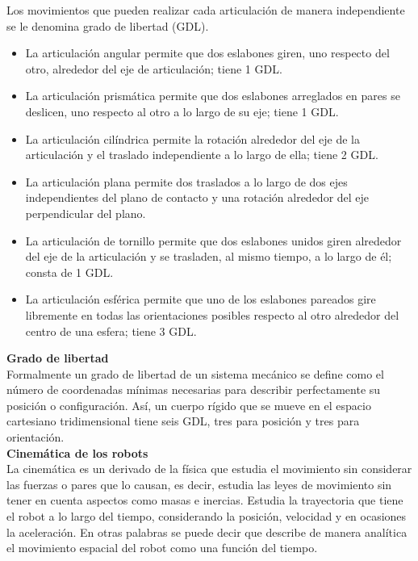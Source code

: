 Los movimientos que pueden realizar cada articulación de manera independiente se le denomina grado de libertad (GDL).
\begin{itemize}
\item La articulación angular permite que dos eslabones giren, uno respecto del otro, alrededor del eje de articulación; tiene 1 GDL.
\item La articulación prismática permite que dos eslabones arreglados en pares se deslicen, uno respecto al otro a lo largo de su eje; tiene 1 GDL.
\item La articulación cilíndrica permite la rotación alrededor del eje de la articulación y el traslado independiente a lo largo de ella; tiene 2 GDL.
\item La articulación plana permite dos traslados a lo largo de dos ejes independientes del plano de contacto y una rotación alrededor del eje perpendicular del plano.
\item La articulación de tornillo permite que dos eslabones unidos giren alrededor del eje de la articulación y se trasladen, al mismo tiempo, a lo largo de él; consta de 1 GDL.
\item La articulación esférica permite que uno de los eslabones pareados gire libremente en todas las orientaciones posibles respecto al otro alrededor del centro de una esfera; tiene 3 GDL.\\
\end{itemize}

\textbf{Grado de libertad}\\
Formalmente un grado de libertad de un sistema mecánico se define como el número de coordenadas mínimas necesarias para describir perfectamente su posición o configuración. Así, un cuerpo rígido que se mueve en el espacio cartesiano tridimensional tiene seis GDL, tres para posición y tres para orientación.\\ 

\textbf{Cinemática de los robots}\\
La cinemática es un derivado de la física que estudia el movimiento sin considerar las fuerzas o pares que lo causan, es decir, estudia las leyes de movimiento sin tener en cuenta aspectos como masas e inercias. Estudia la trayectoria que tiene el robot a lo largo del tiempo, considerando la posición, velocidad y en ocasiones la aceleración. En otras palabras se puede decir que describe de manera analítica el movimiento espacial del robot como una función del tiempo.\\

